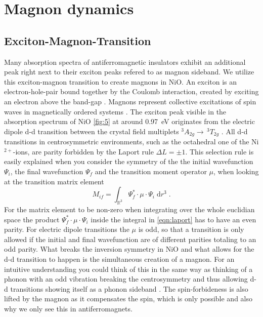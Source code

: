 \section{Magnon dynamics} 
\subsection{Exciton-Magnon-Transition}
\label{sec:x_m}
Many absorption spectra of antiferromagnetic insulators exhibit an additional peak right next to their exciton peaks  refered to as magnon sideband.
We utilize this exciton-magnon transition to create magnons in NiO.
An exciton is an electron-hole-pair bound together by the Coulomb interaction, created by exciting an electron above the band-gap .
Magnons represent collective excitations of spin waves in magnetically ordered systems .
The exciton peak visible in the absorption spectrum of NiO \autoref{fig:5} at around \qty{0.97}{eV} originates from the electric dipole d-d transition between the crystal field multiplets $^3A_{2g} \rightarrow \, ^3T_{2g}$ .
All d-d transitions in centrosymmetric environments, such as the octahedral one of the Ni$^{2+}$-ions, are parity forbidden by the Laport rule $\Delta L = \pm 1$.
This selection rule is easily explained when you consider the symmetry of the the initial wavefunction $\Psi_i$, the final wavefunction $\Psi_f$ and the transition moment operator $\mu$, when looking at the transition matrix element
\begin{equation}
    M_{if} = \int_{\mathbb{R}^3} \Psi^*_f \cdot \mu \cdot \Psi_i \;\text{d}r^3 \;.
    \label{eqn:laport}
\end{equation}
For the matrix element to be non-zero when integrating over the whole euclidian space the product $\Psi^*_f \cdot \mu \cdot \Psi_i$ inside the integral in \autoref{eqn:laport} has to have an even parity.
For electric dipole transitions the $\mu$ is odd, so that a transition is only allowed if the initial and final wavefunction are of different parities totaling to an odd parity.
What breaks the inversion symmetry in NiO and what allows for the d-d transition to happen is the simultaneous creation of a magnon.
For an intuitive understanding you could think of this in the same way as thinking of a phonon with an odd vibration breaking the centrosymmetry and thus allowing d-d transitions showing itself as a phonon sideband .
The spin-forbideness is also lifted by the magnon as it compensates the spin, which is only possible and also why we only see this in antiferromagnets.
